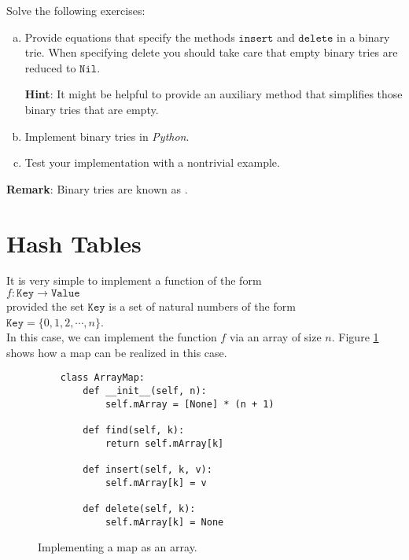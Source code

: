 Solve the following exercises:
\begin{enumerate}[(a)]
\item Provide equations that specify the methods $\texttt{insert}$ and $\texttt{delete}$ in a binary trie.
      When specifying delete you should take care that empty binary tries are reduced to
      $\texttt{Nil}$.

      \textbf{Hint}:  It might be helpful to provide an auxiliary method that simplifies those binary tries
      that are empty. 
\item Implement binary tries in \textsl{Python}.
\item Test your implementation with a nontrivial example.
\end{enumerate}
\textbf{Remark}: Binary tries are known as .  \eox

\section{Hash Tables}
It is very simple to implement a function of the form \\[0.2cm]
\hspace*{1.3cm} $f: \texttt{Key} \rightarrow \texttt{Value}$ \\[0.2cm]
provided the set $\texttt{Key}$ is a set of natural numbers of the form  \\[0.2cm]
\hspace*{1.3cm} $\texttt{Key} = \{ 0, 1, 2, \cdots, n \}$. \\[0.2cm]
In this case, we can implement the function $f$ via an array of size $n$.
Figure \ref{fig:map-array.ipython} shows how a map can be realized in this case.

\begin{figure}[!ht]
\centering
\begin{verbatim}
    class ArrayMap:
        def __init__(self, n):
            self.mArray = [None] * (n + 1)
            
        def find(self, k):
            return self.mArray[k]
        
        def insert(self, k, v):
            self.mArray[k] = v
    
        def delete(self, k):
            self.mArray[k] = None
\end{verbatim}
\vspace*{-0.3cm}
\caption{Implementing a map as an array.}
\label{fig:map-array.ipython}
\end{figure}

